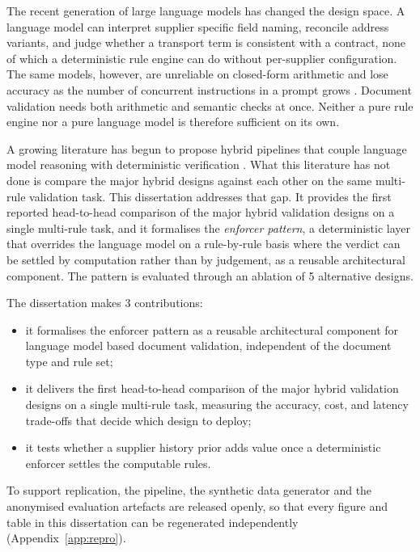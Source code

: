The recent generation of large language models has changed the design space. A language model can interpret supplier specific field naming, reconcile address variants, and judge whether a transport term is consistent with a contract, none of which a deterministic rule engine can do without per-supplier configuration. The same models, however, are unreliable on closed-form arithmetic \citep{arkoudas2023,dziri2024} and lose accuracy as the number of concurrent instructions in a prompt grows \citep{jaroslawicz2025}. Document validation needs both arithmetic and semantic checks at once. Neither a pure rule engine nor a pure language model is therefore sufficient on its own.

A growing literature has begun to propose hybrid pipelines that couple language model reasoning with deterministic verification \citep{prenosil2025,tarannum2026,goodell2025,bayless2025}. What this literature has not done is compare the major hybrid designs against each other on the same multi-rule validation task. This dissertation addresses that gap. It provides the first reported head-to-head comparison of the major hybrid validation designs on a single multi-rule task, and it formalises the \emph{enforcer pattern}, a deterministic layer that overrides the language model on a rule-by-rule basis where the verdict can be settled by computation rather than by judgement, as a reusable architectural component. The pattern is evaluated through an ablation of 5 alternative designs.

The dissertation makes 3 contributions:
\begin{itemize}
  \item it formalises the enforcer pattern as a reusable architectural component for language model based document validation, independent of the document type and rule set;
  \item it delivers the first head-to-head comparison of the major hybrid validation designs on a single multi-rule task, measuring the accuracy, cost, and latency trade-offs that decide which design to deploy;
  \item it tests whether a supplier history prior adds value once a deterministic enforcer settles the computable rules.
\end{itemize}

To support replication, the pipeline, the synthetic data generator and the anonymised evaluation artefacts are released openly, so that every figure and table in this dissertation can be regenerated independently (Appendix~\ref{app:repro}).


